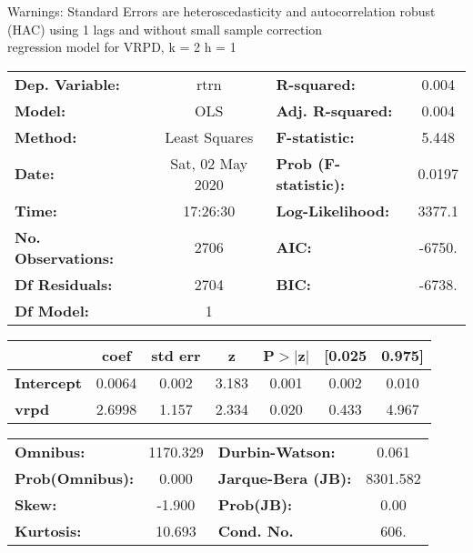 Warnings: \newline
 [1] Standard Errors are heteroscedasticity and autocorrelation robust (HAC) using 1 lags and without small sample correction\\ 

regression model for VRPD, k = 2 h = 1\begin{center}
\begin{tabular}{lclc}
\toprule
\textbf{Dep. Variable:}    &       rtrn       & \textbf{  R-squared:         } &     0.004   \\
\textbf{Model:}            &       OLS        & \textbf{  Adj. R-squared:    } &     0.004   \\
\textbf{Method:}           &  Least Squares   & \textbf{  F-statistic:       } &     5.448   \\
\textbf{Date:}             & Sat, 02 May 2020 & \textbf{  Prob (F-statistic):} &   0.0197    \\
\textbf{Time:}             &     17:26:30     & \textbf{  Log-Likelihood:    } &    3377.1   \\
\textbf{No. Observations:} &        2706      & \textbf{  AIC:               } &    -6750.   \\
\textbf{Df Residuals:}     &        2704      & \textbf{  BIC:               } &    -6738.   \\
\textbf{Df Model:}         &           1      & \textbf{                     } &             \\
\bottomrule
\end{tabular}
\begin{tabular}{lcccccc}
                   & \textbf{coef} & \textbf{std err} & \textbf{z} & \textbf{P$> |$z$|$} & \textbf{[0.025} & \textbf{0.975]}  \\
\midrule
\textbf{Intercept} &       0.0064  &        0.002     &     3.183  &         0.001        &        0.002    &        0.010     \\
\textbf{vrpd}      &       2.6998  &        1.157     &     2.334  &         0.020        &        0.433    &        4.967     \\
\bottomrule
\end{tabular}
\begin{tabular}{lclc}
\textbf{Omnibus:}       & 1170.329 & \textbf{  Durbin-Watson:     } &    0.061  \\
\textbf{Prob(Omnibus):} &   0.000  & \textbf{  Jarque-Bera (JB):  } & 8301.582  \\
\textbf{Skew:}          &  -1.900  & \textbf{  Prob(JB):          } &     0.00  \\
\textbf{Kurtosis:}      &  10.693  & \textbf{  Cond. No.          } &     606.  \\
\bottomrule
\end{tabular}
\end{center}

